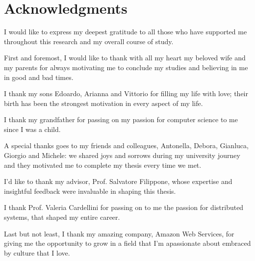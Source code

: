 \chapter*{Acknowledgments}

I would like to express my deepest gratitude to all those who have supported me throughout this research and
my overall course of study.

First and foremost, I would like to thank with all my heart my beloved wife and my parents for always
motivating me to conclude my studies and believing in me in good and bad times.

I thank my sons Edoardo, Arianna and Vittorio for filling my life with love; their birth has been the
strongest motivation in every aspect of my life.

I thank my grandfather for passing on my passion for computer science to me since I was a child.

A special thanks goes to my friends and colleagues, Antonella, Debora, Gianluca, Giorgio and Michele: we
shared joys and sorrows during my university journey and they motivated me to complete my thesis every time we met.

I'd like to thank my advisor, Prof. Salvatore Filippone, whose expertise and insightful feedback were
invaluable in shaping this thesis.

I thank Prof. Valeria Cardellini for passing on to me the passion for distributed systems, that shaped my entire career.

Last but not least, I thank my amazing company, Amazon Web Services, for giving me the opportunity to grow in
a field that I'm apassionate about embraced by culture that I love.
